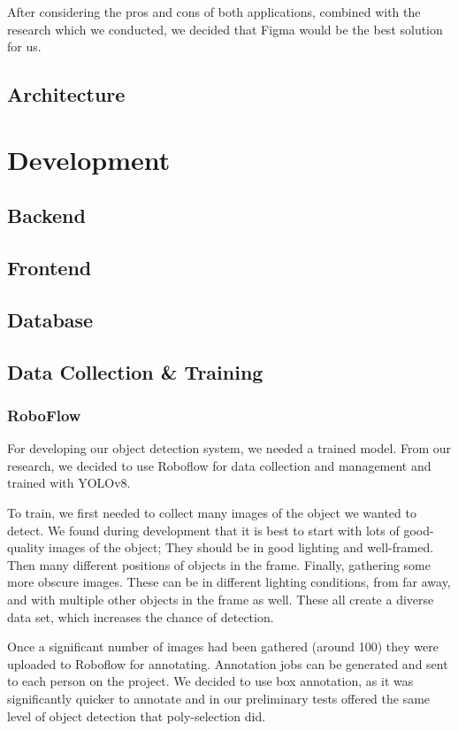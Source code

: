 \documentclass{article}
\begin{document}
    After considering the pros and cons of both applications, combined with the research which we conducted, we decided that Figma would be the best solution for us.
    

    \subsection{Architecture}
  

    \section{Development}
    \subsection{Backend}

    \subsection{Frontend}
 
    \subsection{Database}

    \subsection{Data Collection \& Training}
    \subsubsection{RoboFlow}
    For developing our object detection system, we needed a trained model. From our research, we decided to use Roboflow for data collection and management and trained with YOLOv8.
    
To train, we first needed to collect many images of the object we wanted to detect. We found during development that it is best to start with lots of good-quality images of the object; They should be in good lighting and well-framed. Then many different positions of objects in the frame. Finally, gathering some more obscure images. These can be in different lighting conditions, from far away, and with multiple other objects in the frame as well. These all create a diverse data set, which increases the chance of detection.

Once a significant number of images had been gathered (around 100) they were uploaded to Roboflow for annotating. Annotation jobs can be generated and sent to each person on the project. We decided to use box annotation, as it was significantly quicker to annotate and in our preliminary tests offered the same level of object detection that poly-selection did.
\end{document}

